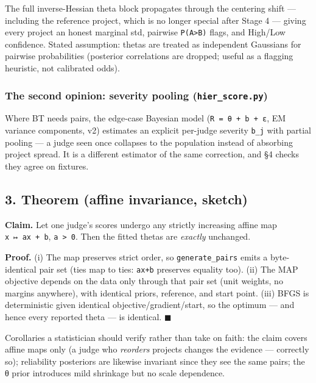 \documentclass[
  11pt,
]{article}
\begin{document}
The full inverse-Hessian theta block propagates through the centering
shift --- including the reference project, which is no longer special
after Stage 4 --- giving every project an honest marginal std, pairwise
\texttt{P(A\textgreater{}B)} flags, and High/Low confidence. Stated
assumption: thetas are treated as independent Gaussians for pairwise
probabilities (posterior correlations are dropped; useful as a flagging
heuristic, not calibrated odds).

\hypertarget{the-second-opinion-severity-pooling-hier_score.py}{%
\subsubsection{\texorpdfstring{The second opinion: severity pooling
(\texttt{hier\_score.py})}{The second opinion: severity pooling (hier\_score.py)}}\label{the-second-opinion-severity-pooling-hier_score.py}}

Where BT needs pairs, the edge-case Bayesian model
(\texttt{R\ =\ θ\ +\ b\ +\ ε}, EM variance components, v2) estimates an
explicit per-judge severity \texttt{b\_j} with partial pooling --- a
judge seen once collapses to the population instead of absorbing project
spread. It is a different estimator of the same correction, and §4
checks they agree on fixtures.

\hypertarget{theorem-affine-invariance-sketch}{%
\subsection{3. Theorem (affine invariance,
sketch)}\label{theorem-affine-invariance-sketch}}

\textbf{Claim.} Let one judge's scores undergo any strictly increasing
affine map \texttt{x\ ↦\ ax\ +\ b}, \texttt{a\ \textgreater{}\ 0}. Then
the fitted thetas are \emph{exactly} unchanged.

\textbf{Proof.} (i) The map preserves strict order, so
\texttt{generate\_pairs} emits a byte-identical pair set (ties map to
ties: \texttt{ax+b} preserves equality too). (ii) The MAP objective
depends on the data only through that pair set (unit weights, no margins
anywhere), with identical priors, reference, and start point. (iii) BFGS
is deterministic given identical objective/gradient/start, so the
optimum --- and hence every reported theta --- is identical. \ensuremath{\blacksquare}

Corollaries a statistician should verify rather than take on faith: the
claim covers affine maps only (a judge who \emph{reorders} projects
changes the evidence --- correctly so); reliability posteriors are
likewise invariant since they see the same pairs; the θ prior introduces
mild shrinkage but no scale dependence.
\end{document}
